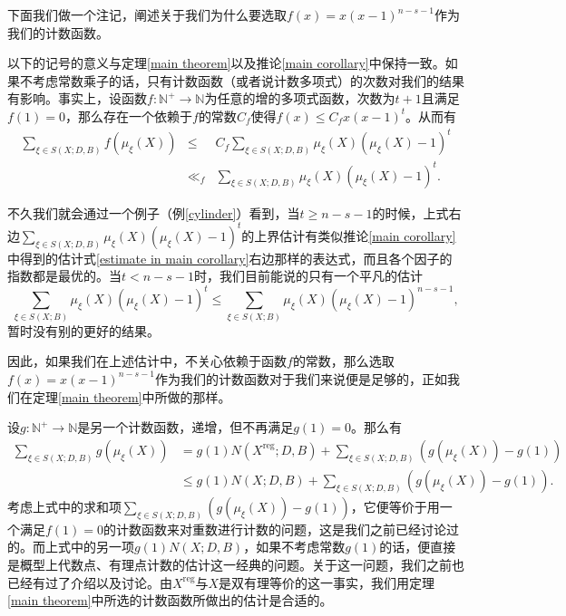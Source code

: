 下面我们做一个注记，阐述关于我们为什么要选取$f(x) = x(x-1)^{n-s-1}$作为我们的计数函数。

\begin{remark}
以下的记号的意义与定理\ref{main theorem}以及推论\ref{main corollary}中保持一致。如果不考虑常数乘子的话，只有计数函数（或者说计数多项式）的次数对我们的结果有影响。事实上，设函数$f:\mathbb N^+\rightarrow \mathbb N$为任意的增的多项式函数，次数为$t+1$且满足$f(1)=0$，那么存在一个依赖于$f$的常数$C_f$使得$f(x)\leqslant C_fx(x-1)^t$。从而有
\begin{eqnarray}
\sum_{\xi\in S(X;D,B)} f(\mu_\xi(X)) & \leqslant & C_f \sum_{\xi\in S(X;D,B)} \mu_\xi(X)(\mu_\xi(X)-1)^t \nonumber \\
& \ll_f & \sum_{\xi\in S(X;D,B)} \mu_\xi(X)(\mu_\xi(X)-1)^t.
\end{eqnarray}

不久我们就会通过一个例子（例\ref{cylinder}）看到，当$t\geqslant n-s-1$的时候，上式右边$\sum\limits_{\xi\in S(X;D,B)} \mu_\xi(X)(\mu_\xi(X)-1)^t$的上界估计有类似推论\ref{main corollary}中得到的估计式\eqref{estimate in main corollary}右边那样的表达式，而且各个因子的指数都是最优的。当$t<n-s-1$时，我们目前能说的只有一个平凡的估计
\begin{equation}
\sum\limits_{\xi\in S(X;B)}\mu_\xi(X)(\mu_\xi(X)-1)^t \leqslant \sum\limits_{\xi\in S(X;B)}\mu_\xi(X)(\mu_\xi(X)-1)^{n-s-1},
\end{equation}
暂时没有别的更好的结果。

因此，如果我们在上述估计中，不关心依赖于函数$f$的常数，那么选取$f(x)=x(x-1)^{n-s-1}$作为我们的计数函数对于我们来说便是足够的，正如我们在定理\ref{main theorem}中所做的那样。

设$g:\mathbb N^+\rightarrow\mathbb N$是另一个计数函数，递增，但不再满足$g(1)=0$。那么有
\begin{align}
\sum_{\xi\in S(X;D,B)} g(\mu_\xi(X)) & = g(1)N(X^{\mathrm{reg}};D,B) + \sum_{\xi\in S(X;D,B)} \left(g(\mu_\xi(X))-g(1)\right) \nonumber \\
& \leqslant g(1)N(X;D,B) + \sum_{\xi\in S(X;D,B)} \left(g(\mu_\xi(X))-g(1)\right).
\end{align}
考虑上式中的求和项$\sum\limits_{\xi\in S(X;D,B)} \left(g(\mu_\xi(X))-g(1)\right)$，它便等价于用一个满足$f(1)=0$的计数函数来对重数进行计数的问题，这是我们之前已经讨论过的。而上式中的另一项$g(1)N(X;D,B)$，如果不考虑常数$g(1)$的话，便直接是概型上代数点、有理点计数的估计这一经典的问题。关于这一问题，我们之前也已经有过了介绍以及讨论。由$X^\mathrm{reg}$与$X$是双有理等价的这一事实，我们用定理\ref{main theorem}中所选的计数函数所做出的估计是合适的。
\end{remark}

